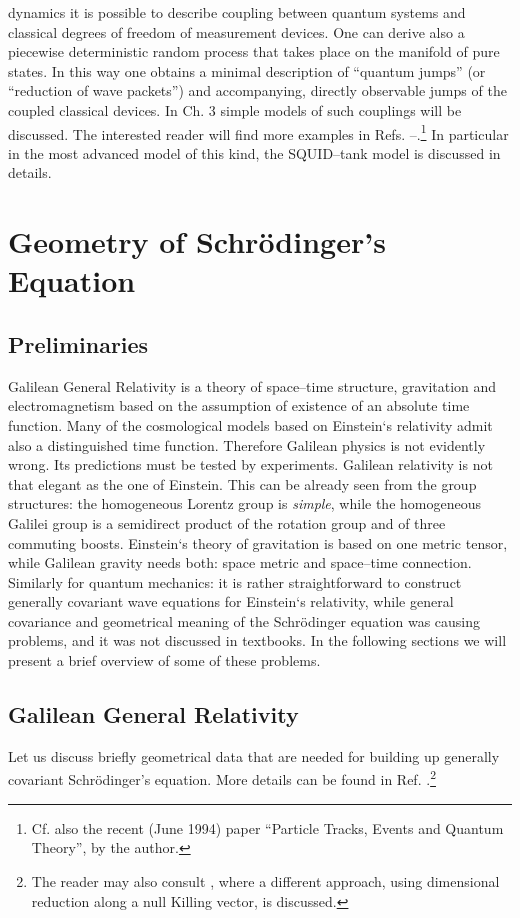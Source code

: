 \documentclass[12pt]{article}
\begin{document}
dynamics it is possible to describe coupling between quantum
systems and classical degrees of freedom of measurement devices. 
One can derive also a piecewise deterministic random process
that takes place on the manifold of pure states.  In  this way
one obtains a minimal description of ``quantum jumps''  (or
``reduction of wave packets'') and accompanying,  directly
observable jumps of the coupled classical devices.  In Ch.  3
simple models of such couplings will be discussed.  The
interested reader will find more examples in Refs. 
\cite{bla2}--\cite{bla5}.\footnote{Cf. also the recent (June 1994) paper ``Particle Tracks,
Events and Quantum Theory'', by the author.}
In particular in \cite{bla5} the most
advanced model of this kind,  the SQUID--tank
model is discussed in details.
\section{Geometry of Schr\"odinger's Equation}
\subsection{Preliminaries}
Galilean General Relativity is a theory of space--time
structure,  gravitation and electromagnetism based on the
assumption of existence of an absolute time function.  Many of the
cosmological models based on Einstein`s relativity admit also a 
distinguished time function.  Therefore Galilean physics is not
evidently wrong.  Its predictions must be tested by experiments. 
Galilean relativity is not
that elegant as the one of Einstein.  This can be already seen
from the group structures:  the homogeneous Lorentz group is
{\em simple},  while the homogeneous Galilei group is a semidirect
product of the rotation group and of three commuting boosts.
Einstein`s theory of gravitation is based on one metric tensor, 
while Galilean gravity needs both:  space metric and space--time
connection.  Similarly for quantum mechanics:  it is rather
straightforward to construct generally covariant wave equations
for Einstein`s relativity,  while general covariance and
geometrical meaning of the Schr\"{o}dinger equation was causing
problems,  and it was not discussed in textbooks.  In the
following sections we will present a brief overview of some
of these problems. 
\subsection{Galilean General Relativity}
Let us discuss briefly geometrical data that are needed for building up
generally covariant Schr\"odinger's equation.  More details can be
found in Ref. \cite{jamo}.\footnote{The reader may also consult \cite{duv}, 
where a different approach,  using dimensional reduction along a
null Killing vector,  is discussed.  }
\end{document}
